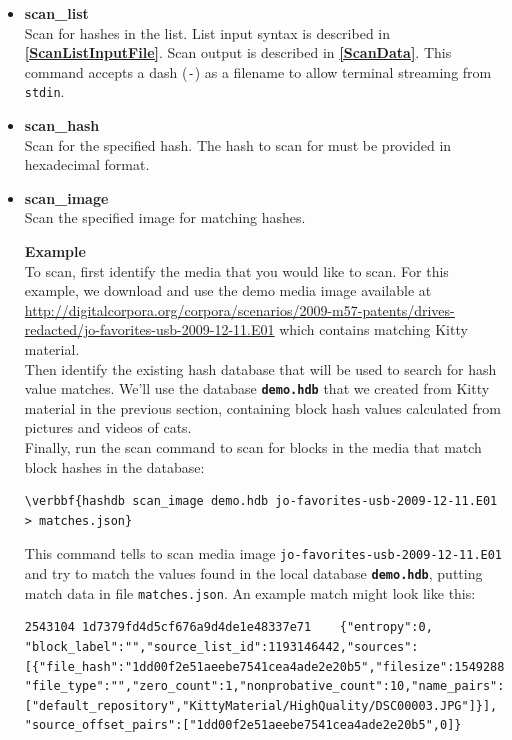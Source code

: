 \documentclass[11pt,fleqn]{article} %
\begin{document}
\begin{itemize}
\item \textbf{scan\_list}\\
Scan for hashes in the list. List input syntax is described in \textbf{\autoref{ScanListInputFile}}. Scan output is described in \textbf{\autoref{ScanData}}. This command accepts a dash (\verb+-+) as a filename to allow terminal streaming from \verb+stdin+.\\
\item \textbf{scan\_hash}\\
Scan for the specified hash. The hash to scan for must be provided in hexadecimal format.
\item \textbf{scan\_image}\\
Scan the specified image for matching hashes.

\textbf{Example}\\
To scan, first identify the media that you would like to scan. For this example, we download and use the demo media image available at \url{ http://digitalcorpora.org/corpora/scenarios/2009-m57-patents/drives-redacted/jo-favorites-usb-2009-12-11.E01} which contains matching Kitty material.\\

Then identify the existing hash database that will be used to search for hash value matches. We'll use the database \texttt{\textbf{demo.hdb}} that we created from Kitty material in the previous section, containing block hash values calculated from pictures and videos of cats.\\

Finally, run the \hdb scan command to scan for blocks in the media that match block hashes in the database:
\begin{Verbatim}[commandchars=\\\{\}]
\verbbf{hashdb scan_image demo.hdb jo-favorites-usb-2009-12-11.E01 > matches.json}
\end{Verbatim}
This command tells \hdb to scan media image \verb+jo-favorites-usb-2009-12-11.E01+ and try to match the values found in the local database \texttt{\textbf{demo.hdb}}, putting match data in file \verb+matches.json+.  An example match might look like this:

\begingroup
\footnotesize
\begin{Verbatim}[fontfamily=courier]
2543104	1d7379fd4d5cf676a9d4de1e48337e71	{"entropy":0,
"block_label":"","source_list_id":1193146442,"sources":
[{"file_hash":"1dd00f2e51aeebe7541cea4ade2e20b5","filesize":1549288,
"file_type":"","zero_count":1,"nonprobative_count":10,"name_pairs":
["default_repository","KittyMaterial/HighQuality/DSC00003.JPG"]}],
"source_offset_pairs":["1dd00f2e51aeebe7541cea4ade2e20b5",0]}
\end{Verbatim}
\endgroup


\end{itemize}
\end{document}

